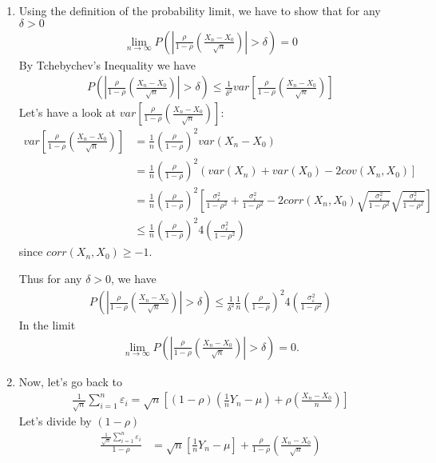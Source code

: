 \begin{Solution}{9.4}
\begin{enumerate}
\begin{enumerate}
    \item Using the definition of the probability limit, we have to show that for any $\delta>0$
        \begin{align*}
          \lim_{n\rightarrow \infty} P\left(\left|\frac{\rho}{1-\rho}\left(\frac{X_n - X_0}{\sqrt{n}}\right)\right|> \delta\right) = 0
        \end{align*}
        By Tchebychev's Inequality we have
        \begin{align*}
        P\left(\left|\frac{\rho}{1-\rho}\left(\frac{X_n - X_0}{\sqrt{n}}\right)\right|> \delta\right) \leq \frac{1}{\delta^2} var\left[\frac{\rho}{1-\rho}\left(\frac{X_n - X_0}{\sqrt{n}}\right)\right]
        \end{align*}
        Let's have a look at $var\left[\frac{\rho}{1-\rho}\left(\frac{X_n - X_0}{\sqrt{n}}\right)\right]$:
        \begin{align*}
        var\left[\frac{\rho}{1-\rho}\left(\frac{X_n - X_0}{\sqrt{n}}\right)\right]
        &= \frac{1}{n}\left(\frac{\rho}{1-\rho}\right)^2 var(X_n - X_0)\\
        &= \frac{1}{n}\left(\frac{\rho}{1-\rho}\right)^2 \left(var(X_n) + var(X_0) - 2 cov(X_n,X_0)\right]\\
        &= \frac{1}{n}\left(\frac{\rho}{1-\rho}\right)^2 \left[\frac{\sigma_\varepsilon^2}{1-\rho^2} + \frac{\sigma_\varepsilon^2}{1-\rho^2} - 2 corr(X_n,X_0)\sqrt{\frac{\sigma_\varepsilon^2}{1-\rho^2}}\sqrt{\frac{\sigma_\varepsilon^2}{1-\rho^2}} \right]\\
        &\leq \frac{1}{n}\left(\frac{\rho}{1-\rho}\right)^2 4 \left(\frac{\sigma_\varepsilon^2}{1-\rho^2}\right)
        \end{align*}
        since $corr(X_n,X_0) \geq -1$.

        Thus for any $\delta>0$, we have
        \begin{align*}
        P\left(\left|\frac{\rho}{1-\rho}\left(\frac{X_n - X_0}{\sqrt{n}}\right)\right|> \delta\right) \leq \frac{1}{\delta^2} \frac{1}{n}\left(\frac{\rho}{1-\rho}\right)^2 4 \left(\frac{\sigma_\varepsilon^2}{1-\rho^2}\right)
        \end{align*}
        In the limit
        \begin{align*}
        \lim_{n\rightarrow \infty} P\left(\left|\frac{\rho}{1-\rho}\left(\frac{X_n - X_0}{\sqrt{n}}\right)\right|> \delta\right) = 0.
        \end{align*}

    \item Now, let's go back to
            \begin{align*}
            \frac{1}{\sqrt{n}} \sum_{i=1}^n \varepsilon_i = \sqrt{n}\left[(1-\rho)\left(\frac{1}{n}Y_n-\mu\right) + \rho\left(\frac{X_n - X_0}{n}\right)\right]
            \end{align*}
            Let's divide by $(1-\rho)$
        \begin{align*}
        \frac{\frac{1}{\sqrt{n}} \sum_{i=1}^n \varepsilon_i}{1-\rho} & = \sqrt{n}\left[\frac{1}{n}Y_n-\mu\right] + \frac{\rho}{1-\rho}\left(\frac{X_n - X_0}{\sqrt{n}}\right)
        \end{align*}


\end{enumerate}
\end{enumerate}
\end{Solution}
